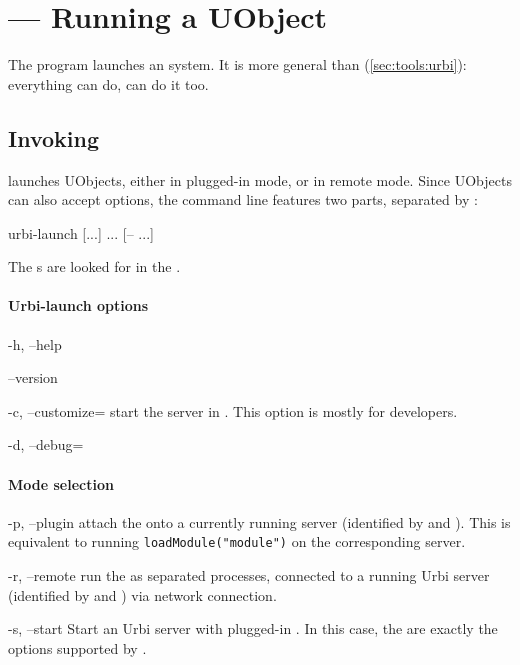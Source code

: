 \section{ --- Running a UObject}
\label{sec:tools:urbi-launch}

The  program launches an \urbi system.  It is
more general than  (\autoref{sec:tools:urbi}):
everything  can do,  can do it too.

\subsection{Invoking }

 launches UObjects, either in plugged-in mode, or
in remote mode.  Since UObjects can also accept options, the command
line features two parts, separated by \samp{--}:

\begin{shell}
urbi-launch [...] ... [-- ...]
\end{shell}

The s are looked for in the .

\paragraph{Urbi-launch options}
\begin{options}
\item[-h, --help] \optionHelp
\item[--version] \optionVersion
\item[-c, --customize=\var{file}] start the \urbi server in
  .  This option is mostly for developers.
\item[-d, --debug=\var{level}] \optionDebug
\end{options}

\paragraph{Mode selection}
\begin{options}
\item[-p, --plugin] attach the  onto a currently running
  \urbi server (identified by  and ).  This is
  equivalent to running \lstinline|loadModule("module")| on the
  corresponding server.

\item[-r, --remote] run the  as separated processes,
  connected to a running Urbi server (identified by  and
  ) via network connection.

\item[-s, --start] Start an Urbi server with plugged-in
  .  In this case, the  are exactly
  the options supported by .
\end{options}

